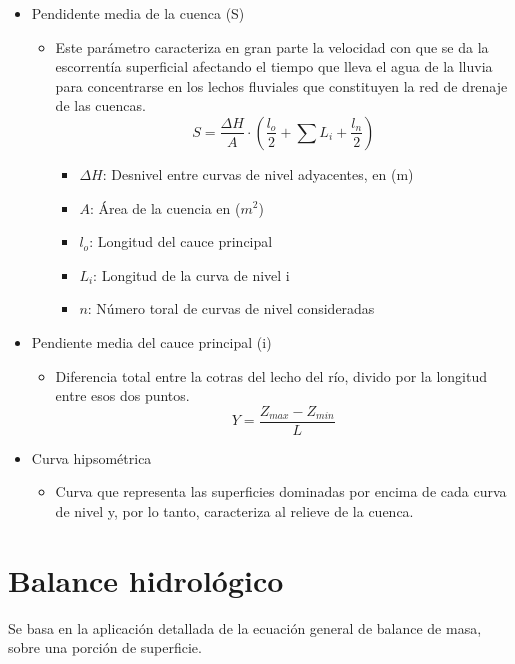 \begin{itemize}
    \item Pendidente media de la cuenca (S)
    \begin{itemize}
        \item Este parámetro caracteriza en gran parte la  velocidad con que se da la escorrentía superficial afectando el tiempo que lleva el agua de la lluvia para concentrarse en los lechos fluviales que constituyen la red de drenaje de las cuencas.
        \begin{equation}
            S = \frac{\Delta H}{A} \cdot (\frac{l_o}{2} + \sum L_i + \frac{l_n}{2})
        \end{equation}
        \begin{itemize}
            \item $\Delta H$: Desnivel entre curvas de nivel adyacentes, en (m)
            \item $A$: Área de la cuencia en ($m^2$)
            \item $l_o$: Longitud del cauce principal
            \item $L_i$: Longitud de la curva de nivel i
            \item $n$: Número toral de curvas de nivel consideradas
        \end{itemize}
    \end{itemize}
    \item Pendiente media del cauce principal (i)
    \begin{itemize}
        \item Diferencia total entre la cotras del lecho del río, divido por la longitud entre esos dos puntos.
        \begin{equation}
            Y = \frac{Z_{max}-Z_{min}}{L}
        \end{equation}
    \end{itemize}
    \item Curva hipsométrica
    \begin{itemize}
        \item Curva que representa las superficies dominadas por encima de cada curva de nivel y, por lo tanto, caracteriza al relieve de la cuenca.
    \end{itemize}
\end{itemize}

\section{Balance hidrológico}   
Se basa en la aplicación detallada de la ecuación general de balance de masa, sobre una porción de superficie.

